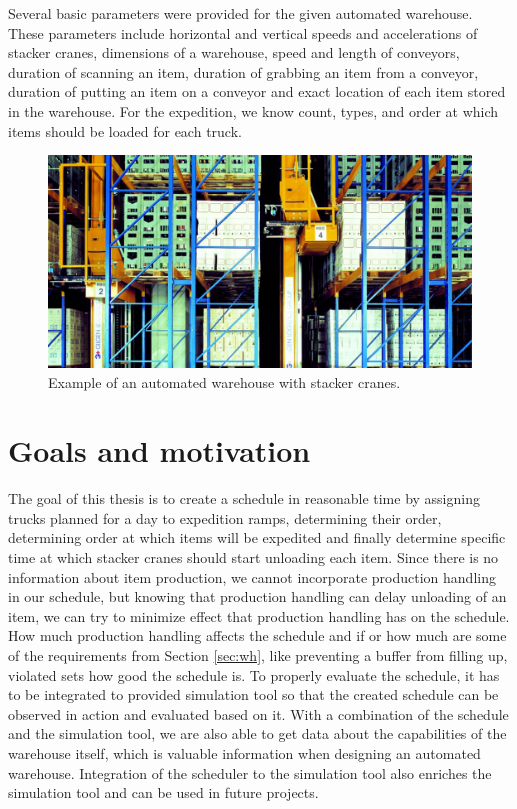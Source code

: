 \documentclass{ctuthesis}
\begin{document}
Several basic parameters were provided for the given automated warehouse. These parameters include horizontal and vertical speeds and accelerations of stacker cranes, dimensions of a warehouse, speed and length of conveyors, duration of scanning an item, duration of grabbing an item from a conveyor, duration of putting an item on a conveyor and exact location of each item stored in the warehouse. For the expedition, we know count, types, and order at which items should be loaded for each truck. 


\begin{figure}
\includegraphics[width=0.8\linewidth]{highbaywarehouse.jpg}
\caption{Example of an automated warehouse with stacker cranes. \cite{warehousepic}}
\label{fig:foobar}
\end{figure}

\section{Goals and motivation}

The goal of this thesis is to create a schedule in reasonable time by assigning trucks planned for a day to expedition ramps, determining their order, determining order at which items will be expedited and finally determine specific time at which stacker cranes should start unloading each item. Since there is no information about item production, we cannot incorporate production handling in our schedule, but knowing that production handling can delay unloading of an item, we can try to minimize effect that production handling has on the schedule. How much production handling affects the schedule and if or how much are some of the requirements from Section \ref{sec:wh}, like preventing a buffer from filling up, violated sets how good the schedule is. To properly evaluate the schedule, it has to be integrated to provided simulation tool so that the created schedule can be observed in action and evaluated based on it. With a combination of the schedule and the simulation tool, we are also able to get data about the capabilities of the warehouse itself, which is valuable information when designing an automated warehouse. Integration of the scheduler to the simulation tool also enriches the simulation tool and can be used in future projects.
\end{document}
